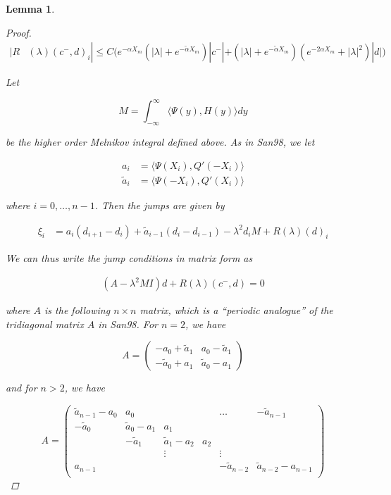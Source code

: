 \documentclass[12pt]{article}
\newtheorem{lemma}{Lemma}
\begin{document}
\begin{lemma}
\begin{proof}
\begin{align*}
|R&(\lambda)(c^-, d)_i| \leq C \Big( e^{-\alpha X_m}(|\lambda| + e^{-\tilde{\alpha} X_m} )|c^-| + 
(|\lambda| + e^{-\tilde{\alpha} X_m} )( e^{-2 \alpha X_m} + |\lambda|^2)|d| \Big)
\end{align*}

Let 

\begin{equation*}
M =  \int_{-\infty}^\infty \langle \Psi(y), H(y) \rangle dy
\end{equation*}

be the higher order Melnikov integral defined above. As in San98, we let

\begin{align*}
a_i &= \langle \Psi(X_i), Q'(-X_i) \rangle \\
\tilde{a}_i &= \langle \Psi(-X_i), Q'(X_i) \rangle
\end{align*}

where $i = 0, \dots, n-1$. Then the jumps are given by 

\begin{align*}
\xi_i &= a_i (d_{i+1} - d_i ) + \tilde{a}_{i-1} (d_i - d_{i-1} ) - \lambda^2 d_i M + R(\lambda)(d)_i
\end{align*}

We can thus write the jump conditions in matrix form as 

\begin{align*}
(A - \lambda^2 MI)d + R(\lambda)(c^-,d) = 0
\end{align*}

where $A$ is the following $n \times n$ matrix, which is a ``periodic analogue'' of the tridiagonal matrix $A$ in San98. For $n = 2$, we have

\[
A = 
\begin{pmatrix}
-a_0 + \tilde{a}_1 & a_0 - \tilde{a}_1 \\
-\tilde{a}_0 + a_1 & \tilde{a}_0 - a_1
\end{pmatrix}
\]

and for $n > 2$, we have

\[
A = 
\begin{pmatrix}
\tilde{a}_{n-1} - a_0 & a_0 & & & \dots & -\tilde{a}_{n-1}\\
-\tilde{a}_0 & \tilde{a}_0 - a_1 &  a_1 \\
& -\tilde{a}_1 & \tilde{a}_1 - a_2 &  a_2 \\
& & \vdots & & \vdots \\
a_{n-1} & & & & -\tilde{a}_{n-2} & \tilde{a}_{n-2} - a_{n-1} \\
\end{pmatrix}
\]

\end{proof}
\end{lemma}
\end{document}

